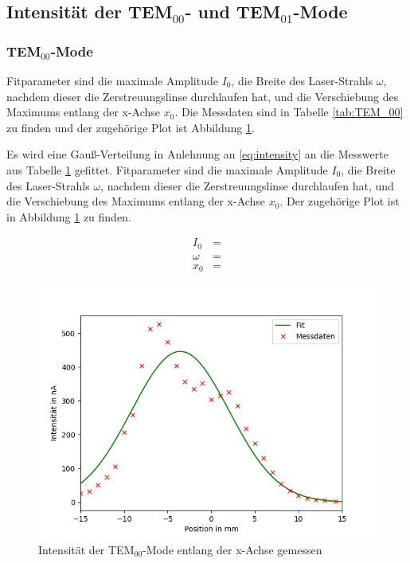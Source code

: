 \subsection{Intensität der TEM$_{00}$- und TEM$_{01}$-Mode}
\subsubsection{TEM$_{00}$-Mode}


Fitparameter sind die maximale Amplitude $I_0$, die Breite des Laser-Strahls $\omega$, nachdem dieser die Zerstreuungslinse durchlaufen hat, und die Verschiebung des Maximums entlang der x-Achse $x_0$. Die Messdaten sind in Tabelle \ref{tab:TEM_00} zu finden und der zugehörige Plot ist Abbildung \ref{fig:TEM_00}.

Es wird eine Gauß-Verteilung in Anlehnung an \eqref{eq:intensity} an die Messwerte aus Tabelle \ref{fig:TEM_00} gefittet. Fitparameter sind die maximale Amplitude $I_0$, die Breite des Laser-Strahls $\omega$, nachdem dieser die Zerstreuungslinse durchlaufen hat, und die Verschiebung des Maximums entlang der x-Achse $x_0$. Der zugehörige Plot ist in Abbildung \ref{fig:TEM_00} zu finden.


\begin{align}
	I_0 &=  \\
	\omega &=   \\
	x_0 &= 
\end{align}
	
 


\begin{figure}[h!]
	\centering
	\includegraphics[width=.7\textwidth]{build/TEM_00.png}
	\caption{Intensität der TEM$_{00}$-Mode entlang der x-Achse gemessen}
	\label{fig:TEM_00}
\end{figure} 

